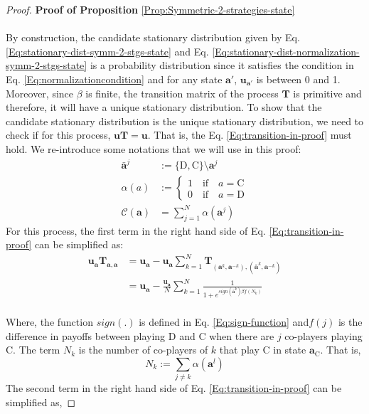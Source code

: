 \documentclass[11pt]{article}
\theoremstyle{plainCl1}
\theoremstyle{plainCl2}
\newcommand{\abf}{\mathbf{a}}
\newcommand{\T}{\mathbf{T}}
\newcommand{\ubf}{\mathbf{u}}
\newcommand{\C}{\mathrm{C}}
\newcommand{\D}{\mathrm{D}}
\begin{document}
\begin{proof}
\textbf{Proof of Proposition} \ref{Prop:Symmetric-2-strategies-state} \\ \\
By construction, the candidate stationary distribution given by Eq. \ref{Eq:stationary-dist-symm-2-stgs-state} and Eq. \ref{Eq:stationary-dist-normalization-symm-2-stgs-state} is a probability distribution since it satisfies the condition in Eq. \ref{Eq:normalizationcondition} and for any state $\abf'$, $\ubf_{\abf'}$ is between 0 and 1.  Moreover, since $\beta$ is finite, the transition matrix of the process $\T$ is primitive and therefore, it will have a unique stationary distribution. To show that the candidate stationary distribution is the unique stationary distribution, we need to check if for this process, $\ubf \T= \ubf$. That is, the Eq. \ref{Eq:transition-in-proof} must hold. We re-introduce some notations that we will use in this proof: 
\begin{align}
\bar{\abf}^j &:= \{\D,\C\} \setminus \abf^j \\[10pt]
\alpha(a)&:= 
\begin{cases}
1 \quad \text{if} \quad a = \C \\[10pt]
0 \quad \text{if} \quad a = \D 
\end{cases}\\[10pt]
\mathcal{C}(\abf) &= \sum_{j=1}^N \alpha(\abf^j)
\end{align}
For this process, the first term in the right hand side of Eq. \ref{Eq:transition-in-proof} can be simplified as: 
\begin{align}
\ubf_{\abf} \T_{\abf,\abf}  &= \ubf_\abf - \ubf_{\abf} \sum_{k=1}^{N} \T_{(\abf^k, \abf^{-k}),(\bar{\abf}^{k}, \abf^{-k})} \\[10pt]
&= \ubf_{\abf} - \frac{\ubf_{\abf}}{N} \sum_{k=1}^N \frac{1}{1 + \displaystyle e^{\mathit{sign}(\bar{\abf}^{k}) \beta f(N_k)}}
\label{Eq:T_aa_u_a term}
\end{align}
\\ \noindent Where, the function $\mathit{sign}(.)$ is  defined in Eq. \ref{Eq:sign-function} and$f(j)$ is the difference in payoffs between playing $\D$ and $\C$ when there are $j$ co-players playing $\C$. The term $N_k$ is the number of co-players of $k$ that play $\C$ in state $\abf_\C$. That is,
\begin{equation}
N_k := \sum_{j \neq k} \alpha(\abf^l)
\end{equation}
The second term in the right hand side of Eq. \ref{Eq:transition-in-proof} can be simplified as, 

\end{proof}
\end{document}
